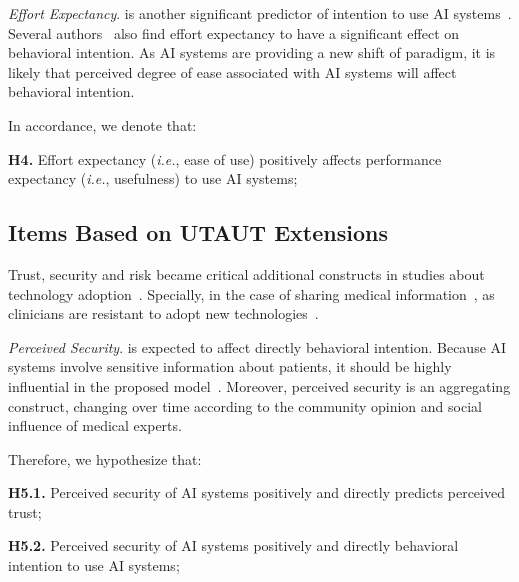 {\it Effort Expectancy}. is another significant predictor of intention to use AI systems~\cite{doi:10.5465/amr.2019.0178}.
Several authors~\cite{Fan2020, Tran2021} also find effort expectancy to have a significant effect on behavioral intention.
As AI systems are providing a new shift of paradigm, it is likely that perceived degree of ease associated with AI systems will affect behavioral intention.

\noindent
In accordance, we denote that:

\vspace{2.25mm}

\noindent
{\bf H4.} Effort expectancy ({\it i.e.}, ease of use) positively affects performance expectancy ({\it i.e.}, usefulness) to use AI systems;

\subsection{Items Based on UTAUT Extensions}
\label{sec:chap004003002}

Trust, security and risk became critical additional constructs in studies about technology adoption~\cite{KHALILZADEH2017460, https://doi.org/10.1002/mar.20823}.
Specially, in the case of sharing medical information~\cite{6038852}, as clinicians are resistant to adopt new technologies~\cite{10.1145/3132272.3134111}.

\vspace{2.25mm}

{\it Perceived Security}. is expected to affect directly behavioral intention.
Because AI systems involve sensitive information about patients, it should be highly influential in the proposed model~\cite{KHALILZADEH2017460}.
Moreover, perceived security is an aggregating construct, changing over time according to the community opinion and social influence of medical experts.

\vspace{2.25mm}

\noindent
Therefore, we hypothesize that:

\vspace{2.25mm}

\noindent
{\bf H5.1.} Perceived security of AI systems positively and directly predicts perceived trust;

\vspace{2.25mm}

\noindent
{\bf H5.2.} Perceived security of AI systems positively and directly behavioral intention to use AI systems;

